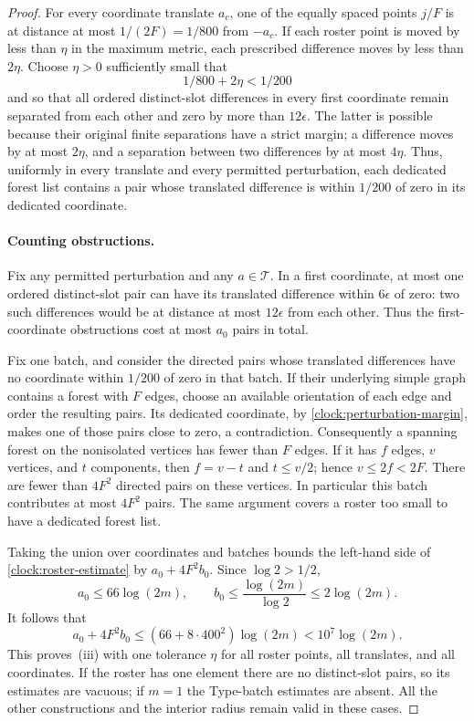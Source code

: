\begin{proof}
For every coordinate translate $a_c$, one of the equally spaced
points $j/F$ is at distance at most $1/(2F)=1/800$ from $-a_c$.
If each roster point is moved by less than $\eta$ in the maximum
metric, each prescribed difference moves by less than $2\eta$.
Choose $\eta>0$ sufficiently small that
\begin{equation}\label{clock:perturbation-margin}
                     1/800+2\eta<1/200
\end{equation}
and so that all ordered distinct-slot differences in every first
coordinate remain separated from each other and zero by more than
$12\epsilon$. The latter is possible because their original finite
separations have a strict margin; a difference moves by at most
$2\eta$, and a separation between two differences by at most
$4\eta$. Thus, uniformly in every translate and every permitted
perturbation, each dedicated forest list contains a pair whose
translated difference is within $1/200$ of zero in its dedicated
coordinate.

\paragraph{Counting obstructions.}
Fix any permitted perturbation and any $a\in\mathcal T$. In a first
coordinate, at most one ordered distinct-slot pair can have its
translated difference within $6\epsilon$ of zero: two such
differences would be at distance at most $12\epsilon$ from each
other. Thus the first-coordinate obstructions cost at most $a_0$
pairs in total.

Fix one batch, and consider the directed pairs whose translated
differences have no coordinate within $1/200$ of zero in that batch.
If their underlying simple graph contains a forest with $F$ edges,
choose an available orientation of each edge and order the resulting
pairs. Its dedicated coordinate, by
\eqref{clock:perturbation-margin}, makes one of those pairs close to
zero, a contradiction. Consequently a spanning forest on the
nonisolated vertices has fewer than $F$ edges. If it has $f$ edges,
$v$ vertices, and $t$ components, then $f=v-t$ and $t\le v/2$;
hence $v\le2f<2F$. There are fewer than $4F^2$ directed pairs on
these vertices. In particular this batch contributes at most $4F^2$
pairs. The same argument covers a roster too small to have a dedicated
forest list.

Taking the union over coordinates and batches bounds the left-hand
side of \eqref{clock:roster-estimate} by $a_0+4F^2b_0$. Since
$\log2>1/2$,
\[
 a_0\le66\log(2m),\qquad
 b_0\le\frac{\log(2m)}{\log2}\le2\log(2m).
\]
It follows that
\[
 a_0+4F^2b_0
 \le(66+8\cdot400^2)\log(2m)
 <10^7\log(2m).
\]
This proves~\textup{(iii)} with one tolerance $\eta$ for all roster
points, all translates, and all coordinates. If the roster has one
element there are no distinct-slot pairs, so its estimates are
vacuous; if $m=1$ the Type-batch estimates are absent. All the other
constructions and the interior radius remain valid in these cases.
\end{proof}

